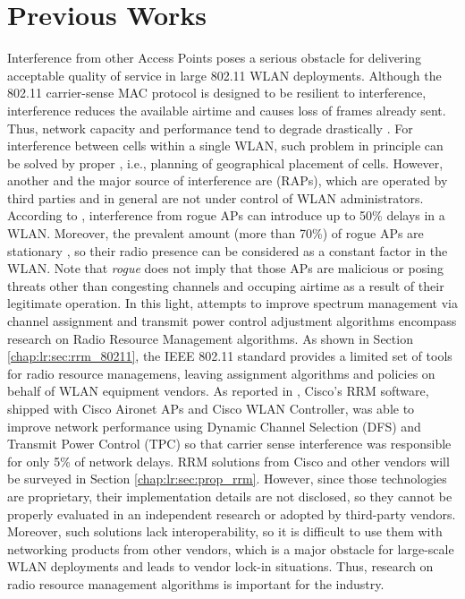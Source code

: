 \section {Previous Works}
\label{chap:lr:sec:prev_works}
Interference from other Access Points poses a serious obstacle \cite{suiHowBadAre2015} for delivering acceptable quality of service in large 802.11 WLAN deployments. Although the 802.11 carrier-sense MAC protocol is designed to be resilient to interference, interference reduces the available airtime and causes loss of frames already sent. Thus, network capacity and performance tend to degrade drastically \cite{levantiCAPWAPCompliantSolutionRadio2007}. For interference between cells within a single WLAN, such problem in principle can be solved by proper \cite{site surveying}, i.e., planning of geographical placement of cells. However, another and the major source of interference are  (RAPs), which are operated by third parties and in general are not under control of WLAN administrators. According to \cite{suiHowBadAre2015}, interference from rogue APs can introduce up to 50\% delays in a WLAN. Moreover, the prevalent amount (more than 70\%) of rogue APs are stationary \cite{suiHowBadAre2015}, so their radio presence can be considered as a constant factor in the WLAN. Note that \textit{rogue} does not imply that those APs are malicious or posing threats other than congesting channels and occuping airtime as a result of their legitimate operation.
In this light, attempts to improve spectrum management via channel assignment and transmit power control adjustment algorithms encompass research on Radio Resource Management algorithms. As shown in Section \ref{chap:lr:sec:rrm_80211}, the IEEE 802.11 standard provides a limited set of tools for radio resource managemens, leaving assignment algorithms and policies on behalf of WLAN equipment vendors. As reported in \cite{suiHowBadAre2015}, Cisco's RRM software, shipped with Cisco Aironet APs and Cisco WLAN Controller, was able to improve network performance using Dynamic Channel Selection (DFS) and Transmit Power Control (TPC)  so that carrier sense interference was responsible for only 5\% of network delays. RRM solutions from Cisco and other vendors will be surveyed in Section \ref{chap:lr:sec:prop_rrm}. However, since those technologies are proprietary, their implementation details are not disclosed, so they cannot be properly evaluated in an independent research or adopted by third-party vendors. Moreover, such solutions lack interoperability, so it is difficult to use them with networking products from other vendors, which is a major obstacle for large-scale WLAN deployments and leads to vendor lock-in situations. Thus, research on radio resource management algorithms is important for the industry.

